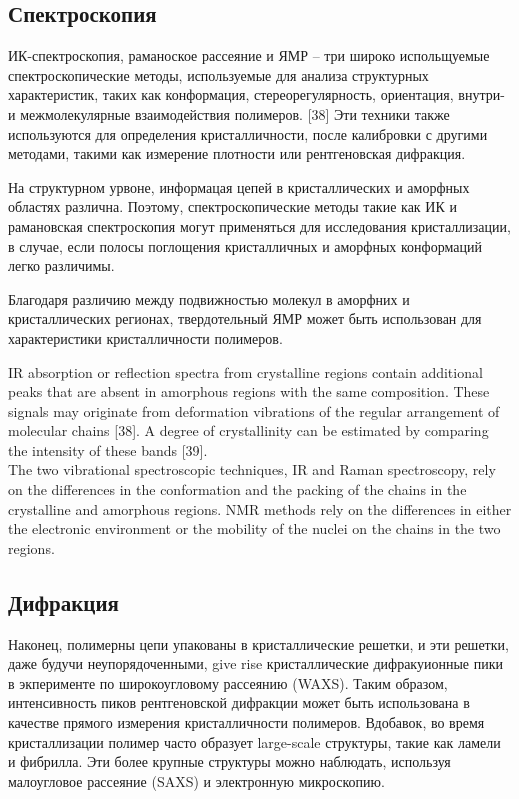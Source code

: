 \subsection{Спектроскопия}
ИК-спектроскопия, раманоское рассеяние и ЯМР -- три широко испольщуемые спектроскопические методы, используемые для анализа структурных характеристик, таких как конформация, стереорегулярность, ориентация, внутри- и межмолекулярные взаимодействия полимеров. [38] 
Эти техники также используются для определения кристалличности, после калибровки с другими методами, такими как измерение плотности или рентгеновская дифракция.



На структурном урвоне, информацая цепей в кристаллических и аморфных областях различна. Поэтому, спектроскопические методы такие как ИК и рамановская спектроскопия могут применяться для исследования кристаллизации, в случае, если полосы поглощения кристалличных и аморфных конформаций легко различимы.

Благодаря различию между подвижностью молекул в аморфних и кристаллических регионах, твердотельный ЯМР может быть использован для характеристики кристалличности полимеров.



IR absorption or reflection
spectra from crystalline regions contain additional peaks that are absent in amorphous
regions with the same composition. These signals may originate from deformation
vibrations of the regular arrangement of molecular chains [38]. A degree of crystallinity
can be estimated by comparing the intensity of these bands [39].\\

The two vibrational spectroscopic
techniques, IR and Raman spectroscopy, rely on the differences in the conformation
and the packing of the chains in the crystalline and amorphous regions. NMR
methods rely on the differences in either the electronic environment or the mobility
of the nuclei on the chains in the two regions.\\

\subsection{Дифракция}

Наконец, полимерны цепи упакованы в кристаллические решетки, и эти решетки, даже будучи неупорядоченными, give rise кристаллические дифракуионные пики в экперименте по широкоугловому рассеянию (WAXS). Таким образом, интенсивность пиков рентгеновской дифракции может быть использована в качестве прямого измерения кристалличности полимеров. Вдобавок, во время кристаллизации полимер часто образует large-scale структуры, такие как ламели и фибрилла. Эти более крупные структуры можно наблюдать, используя малоугловое рассеяние (SAXS) и электронную микроскопию.

